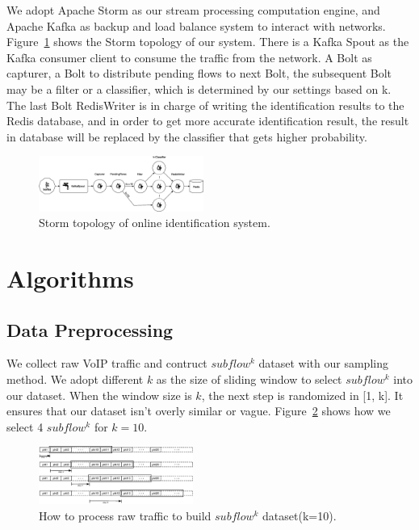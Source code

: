 \documentclass[conference]{IEEEtran}
\begin{document}
We adopt Apache Storm as our stream processing computation engine, and Apache Kafka as backup and load balance system to interact with networks. Figure~\ref{fig:storm} shows the Storm topology of our system. There is a Kafka Spout as the Kafka consumer client to consume the traffic from the network. A Bolt as capturer, a Bolt to distribute pending flows to next Bolt, the subsequent Bolt may be a filter or a classifier, which is determined by our settings based on k. The last Bolt RedisWriter is in charge of writing the identification results to the Redis database, and in order to get more accurate identification result, the result in database will be replaced by the classifier that gets higher probability.

\begin{figure}[htp]
\begin{center}
\includegraphics[width=0.48\textwidth]{storm.eps}
\caption{Storm topology of online identification system.}\label{fig:storm}
\end{center}
\end{figure}


\section{Algorithms}
\label{sec:algorithms}

\subsection{Data Preprocessing}
\label{sec:datapreprocessing}
We collect raw VoIP traffic and contruct $subflow^k$ dataset with our sampling method. We adopt different $k$ as the size of sliding window to select $subflow^k$ into our dataset. When the window size is $k$, the next step is randomized in [1, k]. It ensures that our dataset isn't overly similar or vague. Figure~\ref{fig:dataset} shows how we select 4 $subflow^k$ for $k=10$.
\begin{figure}[htp]
\begin{center}
\includegraphics[width=0.45\textwidth]{dataset.eps}
\caption{How to process raw traffic to build $subflow^k$ dataset(k=10).}\label{fig:dataset}
\end{center}
\end{figure}
\end{document}
